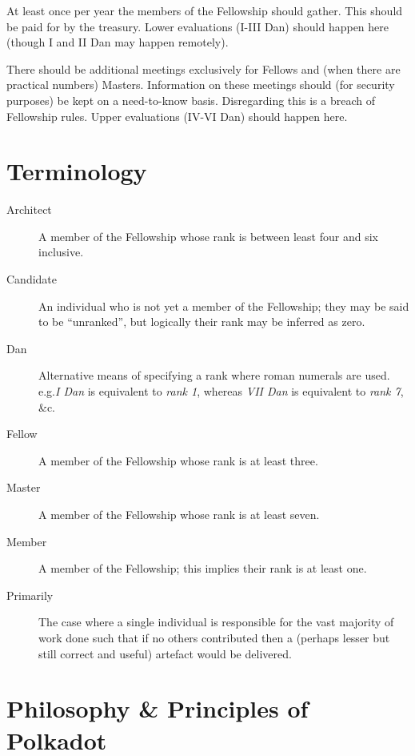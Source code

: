 \documentclass[9pt,oneside]{amsart}
\makeatletter
\newcommand*\Eg{e.g.\@\xspace}
\makeatother
\begin{document}
At least once per year the members of the Fellowship should gather. This should be paid for by the treasury. Lower evaluations (I-III Dan) should happen here (though I and II Dan may happen remotely).

There should be additional meetings exclusively for Fellows and (when there are practical numbers) Masters. Information on these meetings should (for security purposes) be kept on a need-to-know basis. Disregarding this is a breach of Fellowship rules. Upper evaluations (IV-VI Dan) should happen here.

{}


\appendix

\section{Terminology}\label{terminology}

\begin{description}
  \item[Architect] A member of the Fellowship whose rank is between least four and six inclusive.
  \item[Candidate] An individual who is not yet a member of the Fellowship; they may be said to be ``unranked'', but logically their rank may be inferred as zero.
  \item[Dan] Alternative means of specifying a rank where roman numerals are used. \Eg \emph{I Dan} is equivalent to \emph{rank 1}, whereas \emph{VII Dan} is equivalent to \emph{rank 7}, \&c.
  \item[Fellow] A member of the Fellowship whose rank is at least three.
  \item[Master] A member of the Fellowship whose rank is at least seven.
  \item[Member] A member of the Fellowship; this implies their rank is at least one.
  \item[Primarily] The case where a single individual is responsible for the vast majority of work  done such that if no others contributed then a (perhaps lesser but still correct and useful) artefact would be delivered.
\end{description}

\section{Philosophy \& Principles of Polkadot}\label{philosophy-principles-of-polkadot}
\end{document}
